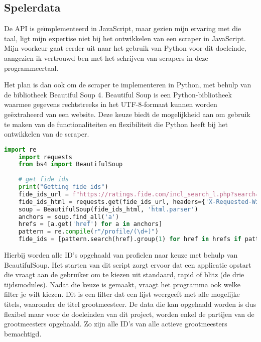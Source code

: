 \subsection{Spelerdata}

De API is geïmplementeerd in JavaScript, maar gezien mijn ervaring met die taal, ligt mijn expertise niet bij het ontwikkelen van een scraper in JavaScript. Mijn voorkeur gaat eerder uit naar het gebruik van Python voor dit doeleinde, aangezien ik vertrouwd ben met het schrijven van scrapers in deze programmeertaal.

Het plan is dan ook om de scraper te implementeren in Python, met behulp van de bibliotheek Beautiful Soup 4. Beautiful Soup is een Python-bibliotheek waarmee gegevens rechtstreeks in het UTF-8-formaat kunnen worden geëxtraheerd van een website. Deze keuze biedt de mogelijkheid aan om gebruik te maken van de functionaliteiten en flexibiliteit die Python heeft bij het ontwikkelen van de scraper.\autocite{Richardson}

\begin{lstlisting}[language=Python]
    import re
    import requests
    from bs4 import BeautifulSoup
    
    # get fide ids
    print("Getting fide ids")
    fide_ids_url = f"https://ratings.fide.com/incl_search_l.php?search=&search_rating={rating}&search_country=all&search_title={title}&search_other_title=all&search_year=undefined&search_low=0&search_high=3500&search_inactive=on&search_exrated=off&search_radio=rating&search_bday_start=all&search_bday_end=all&search_radio=rating&search_asc=descending&search_gender=undefined&simple=0"
    fide_ids_html = requests.get(fide_ids_url, headers={'X-Requested-With': 'XMLHttpRequest'}).text
    soup = BeautifulSoup(fide_ids_html, 'html.parser')
    anchors = soup.find_all('a')
    hrefs = [a.get('href') for a in anchors]
    pattern = re.compile(r"/profile/(\d+)")
    fide_ids = [pattern.search(href).group(1) for href in hrefs if pattern.search(href)]
\end{lstlisting}

Hierbij worden alle ID's opgehaald van profielen naar keuze met behulp van BeautifulSoup. Het starten van dit script zorgt ervoor dat een applicatie opstart die vraagt aan de gebruiker om te kiezen uit standaard, rapid of blitz (de drie tijdsmodules). Nadat die keuze is gemaakt, vraagt het programma ook welke filter je wilt kiezen. Dit is een filter dat een lijst weergeeft met alle mogelijke titels, waaronder de titel grootmeesteer. De data die kan opgehaald worden is dus flexibel maar voor de doeleinden van dit project, worden enkel de partijen van de grootmeesters opgehaald. Zo zijn alle ID's van alle actieve grootmeesters bemachtigd.

